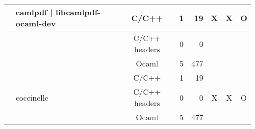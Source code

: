 \documentclass[11pt,a4paper]{article}
\begin{document}
\begin{table}[h,t]
\begin{tabular}{|>{\centering}m{3cm}| m{3cm}|c|r|r| c| c|c|}
 & \multirow{3}{3cm}{camlpdf | libcamlpdf-ocaml-dev} & C/C++ & 1 & 19 & \multirow{3}{*}{X} & \multirow{3}{*}{X} & \multirow{3}{*}{O}\\
 \cline{3-5}
 &  &                           C/C++ headers & 0 & 0 & & & \\
 \cline{3-5}
 & &                           Ocaml & 5 & 477 & & & \\
 \cline{2-8}



 & \multirow{3}{3cm}{coccinelle} & C/C++ & 1 & 19 & \multirow{3}{*}{X} & \multirow{3}{*}{X} & \multirow{3}{*}{O}\\
 \cline{3-5}
 &  &                           C/C++ headers & 0 & 0 & & & \\
 \cline{3-5}
 & &                           Ocaml & 5 & 477 & & & \\
 \hline




\end{tabular}
\end{table}
\end{document}
